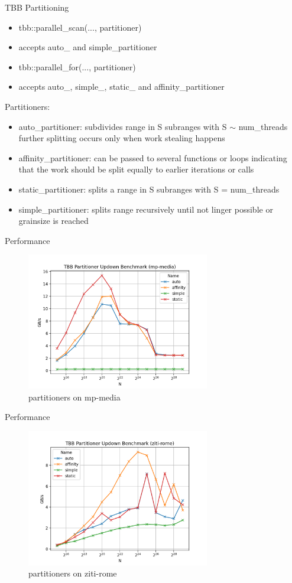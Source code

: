 \begin{frame}{TBB Partitioning} 
	\begin{itemize}
		\item tbb::parallel\_scan(..., partitioner)
		\item accepts auto\_ and simple\_partitioner
		\item tbb::parallel\_for(..., partitioner)
		\item accepts auto\_, simple\_, static\_ and affinity\_partitioner
	\end{itemize}
\end{frame} 

\begin{frame}{Partitioners:}
	\begin{itemize}
		\item auto\_partitioner: subdivides range in S subranges with S $\sim$ num\_threads further splitting occurs only when work stealing happens
		\item affinity\_partitioner: can be passed to several functions or loops indicating that the work should be split equally to earlier iterations or calls
		\item static\_partitioner: splits a range in S subranges with S = num\_threads
		\item simple\_partitioner: splits range recursively until not linger possible or grainsize is reached
	\end{itemize}
\end{frame}

\begin{frame}{Performance}
	\begin{figure}
		\includegraphics[width=80mm]{wiki/TBB Partitioner Updown Benchmark (mp-media).png}
		\caption{{partitioners on mp-media}}
	\end{figure}
\end{frame}

\begin{frame}{Performance}
	\begin{figure}
		\includegraphics[width=80mm]{wiki/TBB Partitioner Updown Benchmark (ziti-rome).png}
		\caption{{partitioners on ziti-rome}}
	\end{figure}
\end{frame}
